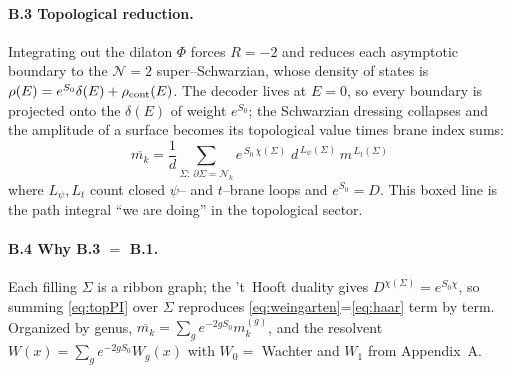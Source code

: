 \documentclass[11pt]{article}
\newif\ifpedagogical
\newcommand{\ped}[1]{\ifpedagogical\par\smallskip{\small\color{pedcol}%
  \leftskip=1.4em\rightskip=1.4em\noindent$\triangleright$~\textit{Plain-language aside.}~#1\par}%
  \par\smallskip\fi}
\begin{document}
\paragraph{B.3 Topological reduction.}
Integrating out the dilaton $\Phi$ forces $R=-2$ and reduces each asymptotic boundary to the
$\mathcal N{=}2$ super--Schwarzian, whose density of states is $\rho(E)=e^{S_0}\delta(E)+\rho_{\rm
cont}(E)$. The decoder lives at $E=0$, so every boundary is projected onto the $\delta(E)$ of weight
$e^{S_0}$; the Schwarzian dressing collapses and the amplitude of a surface becomes its topological
value times brane index sums:
\begin{equation}
  \boxed{\;\overline{m_k}=\frac1d\!\!\sum_{\Sigma:\,\partial\Sigma=\mathcal N_k}
  e^{\,S_0\,\chi(\Sigma)}\;d^{\,L_\psi(\Sigma)}\,m^{\,L_t(\Sigma)}\;}
  \label{eq:topPI}
\end{equation}
where $L_\psi,L_t$ count closed $\psi$-- and $t$--brane loops and $e^{S_0}=D$. This boxed line is the
path integral ``we are doing'' in the topological sector.

\paragraph{B.4 Why B.3 $=$ B.1.}
Each filling $\Sigma$ is a ribbon graph; the 't~Hooft duality gives $D^{\chi(\Sigma)}=e^{S_0\chi}$, so
summing \eqref{eq:topPI} over $\Sigma$ reproduces \eqref{eq:weingarten}=\eqref{eq:haar} term by term.
Organized by genus, $\overline{m_k}=\sum_g e^{-2gS_0}m_k^{(g)}$, and the resolvent
$W(x)=\sum_g e^{-2gS_0}W_g(x)$ with $W_0=$ Wachter and $W_1$ from Appendix~A.
\ped{Crucial caveat. The boxed sum \eqref{eq:topPI} is manifestly a series in $e^{-S_0}$---a
perturbative, ``how many handles'' expansion. Effects that are exponentially small in $e^{S_0}$
(eigenvalues leaking below the spectral edge---the soft tail that dominated $\kappa$) are invisible to
it, exactly as the genus expansion of ordinary JT gravity misses the discreteness of the spectrum.
So the path integral computes $m_{k\ge1}$ but not the non--perturbative $\kappa$.}
\end{document}
